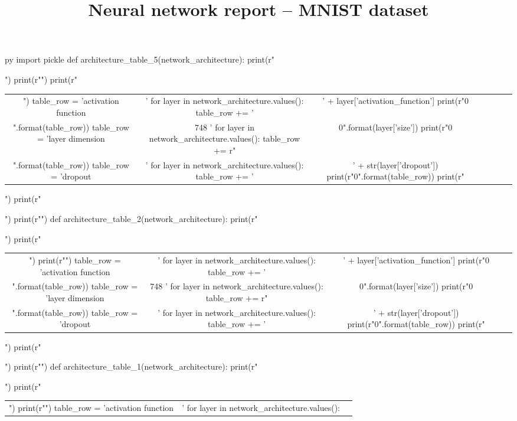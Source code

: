 \documentclass[11pt]{article}
\title{\vspace{-8ex}Neural network report -- MNIST dataset}
\date{\vspace{-12ex}}
\begin{document}
\maketitle
\begin{pythontexcustomcode}{py}
import pickle
def architecture_table_5(network_architecture):
    print(r"\begin{table}[H]")
    print(r"\centering")
    print(r"\begin{tabular}{cc|c|c|c|c|c}")
    table_row = 'activation function & '
    for layer in network_architecture.values():
        table_row += ' & ' + layer['activation_function']
    print(r"{0} \\".format(table_row))
    table_row = 'layer dimension & \LARGE 748 '
    for layer in network_architecture.values():
        table_row += r"& \LARGE {0}".format(layer['size'])
    print(r"{0} \\".format(table_row))
    table_row = 'dropout & '
    for layer in network_architecture.values():
        table_row += '& ' + str(layer['dropout'])
    print(r"{0}".format(table_row))
    print(r"\end{tabular}")
    print(r"\end{table}")
    print(r"")
def architecture_table_2(network_architecture):
    print(r"\begin{table}[H]")
    print(r"\begin{tabular}{cc|c|c}")
    print(r"\centering")
    table_row = 'activation function & '
    for layer in network_architecture.values():
        table_row += ' & ' + layer['activation_function']
    print(r"{0} \\".format(table_row))
    table_row = 'layer dimension & \LARGE 748 '
    for layer in network_architecture.values():
        table_row += r"& \LARGE {0}".format(layer['size'])
    print(r"{0} \\".format(table_row))
    table_row = 'dropout & '
    for layer in network_architecture.values():
        table_row += '& ' + str(layer['dropout'])
    print(r"{0}".format(table_row))
    print(r"\end{tabular}")
    print(r"\end{table}")
    print(r"")
def architecture_table_1(network_architecture):
    print(r"\begin{table}[H]")
    print(r"\begin{tabular}{cc|c}")
    print(r"\centering")
    table_row = 'activation function & '
    for layer in network_architecture.values():

\end{tabular}
\end{table}
\end{pythontexcustomcode}
\end{document}
